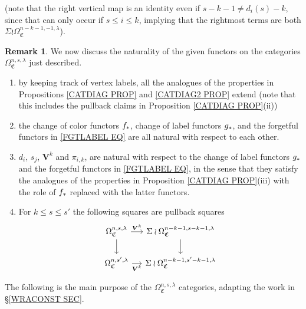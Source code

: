 \documentclass[a4paper,10pt
,draft
]{article}%
\numberwithin{equation}{section}
\numberwithin{figure}{section}
\theoremstyle{definition} %
\newtheorem{remark}[equation]{Remark}%
\newcommand{\1}{\ensuremath{\mathbbm 1}}%
\begin{document}
(note that the right vertical map is an identity even if
$s-k-1 \neq d_i(s)-k$, since that can only occur if $s\leq i \leq k$, implying that the rightmost terms are both $\Sigma \wr \Omega_{\mathfrak{C}}^{n-k-1,-1,\lambda}$).

\begin{remark}
We now discuss the naturality of the given functors on the categories
$\Omega_{\mathfrak{C}}^{n,s,\lambda}$ just described.
\begin{enumerate}[label=(\roman*)]
\item by keeping track of vertex labels, all the analogues of the properties in Propositions \ref{CATDIAG PROP} and \ref{CATDIAG2 PROP} extend (note that this includes the pullback claims in 
Proposition \ref{CATDIAG PROP}(ii))
\item the change of color functors $f_{\**}$, change of label functors $g_{\**}$, and the forgetful functors in
\eqref{FGTLABEL EQ} are all natural with respect to each other.
\item $d_i$, $s_j$, $\boldsymbol{V}^k$
and $\pi_{i,k}$, are natural with respect to the change of label functors $g_{\**}$ and the forgetful functors in
\eqref{FGTLABEL EQ}, 
in the sense that they satisfy the analogues of the properties in 
Proposition \ref{CATDIAG PROP}(iii) with 
the role of $f_{\**}$ replaced with the latter functors.
\item
For $k \leq s \leq s'$ the following squares are pullback squares
\[
\begin{tikzcd}[column sep = small, row sep = small]
	\Omega^{n,s,\lambda}_{\mathfrak{C}} \ar{r}{\boldsymbol{V}^k} \ar{dd} &
	\Sigma \wr \Omega^{n-k-1,s-k-1,\lambda}_{\mathfrak{C}} \ar{dd}
\\
\\
	\Omega^{n,s',\lambda}_{\mathfrak{C}} \ar{r}[swap]{\boldsymbol{V}^k} &
	\Sigma \wr \Omega^{n-k-1,s'-k-1,\lambda}_{\mathfrak{C}}
\end{tikzcd}
\]
\end{enumerate}
\end{remark}

The following is the main purpose of the 
$\Omega_{\mathfrak{C}}^{n,s,\lambda}$ categories,
adapting the work in \S \ref{WRACONST SEC}.
\end{document}
